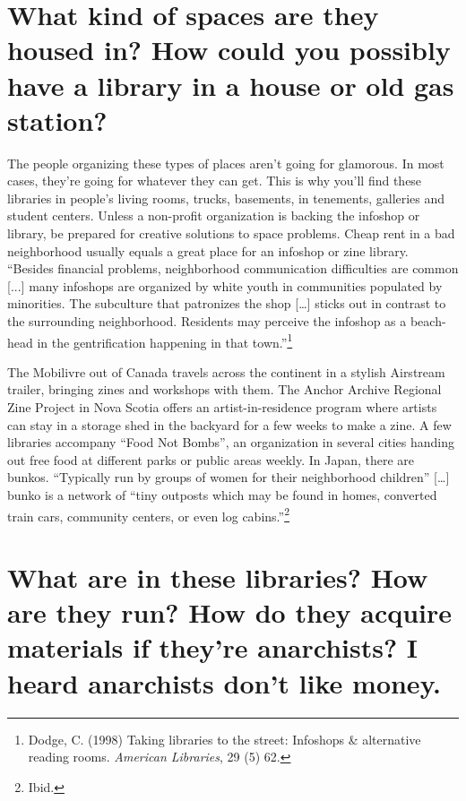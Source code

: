 \documentclass[output=paper]{langscibook}
\begin{document}
\hypertarget{what-kind-of-spaces-are-they-housed-in-how-could-you-possibly-have-a-library-in-a-house-or-old-gas-station}{%
\section*{What kind of spaces are they housed in? How could you possibly
have a library in a house or old gas
station?}\label{what-kind-of-spaces-are-they-housed-in-how-could-you-possibly-have-a-library-in-a-house-or-old-gas-station}}

The people organizing these types of places aren't going for glamorous.
In most cases, they're going for whatever they can get. This is why
you'll find these libraries in people's living rooms, trucks, basements,
in tenements, galleries and student centers. Unless a non-profit
organization is backing the infoshop or library, be prepared for
creative solutions to space problems. Cheap rent in a bad neighborhood
usually equals a great place for an infoshop or zine library.
\enquote{Besides financial problems, neighborhood communication
difficulties are common {[}...{]} many infoshops are organized by white
youth in communities populated by minorities. The subculture that
patronizes the shop {[}\ldots{]} sticks out in contrast to the
surrounding neighborhood. Residents may perceive the infoshop as a
beach-head in the gentrification happening in that town.}\footnote{Dodge,
  C. (1998) Taking libraries to the street: Infoshops \& alternative
  reading rooms. \emph{American Libraries}, 29 (5) 62.}

The Mobilivre out of Canada travels across the continent in a stylish
Airstream trailer, bringing zines and workshops with them. The Anchor
Archive Regional Zine Project in Nova Scotia offers an
artist-in-residence program where artists can stay in a storage shed in
the backyard for a few weeks to make a zine. A few libraries accompany
\enquote{Food Not Bombs}, an organization in several cities handing out
free food at different parks or public areas weekly. In Japan, there are
bunkos. \enquote{Typically run by groups of women for their neighborhood
children} {[}\ldots{]} bunko is a network of \enquote{tiny outposts
which may be found in homes, converted train cars, community centers, or
even log cabins.}\footnote{Ibid.}

\hypertarget{what-are-in-these-libraries-how-are-they-run-how-do-they-acquire-materials-if-theyre-anarchists-i-heard-anarchists-dont-like-money.}{%
\section*{What are in these libraries? How are they run? How do they
acquire materials if they're anarchists? I heard anarchists don't like
money.}\label{what-are-in-these-libraries-how-are-they-run-how-do-they-acquire-materials-if-theyre-anarchists-i-heard-anarchists-dont-like-money.}}
\end{document}
